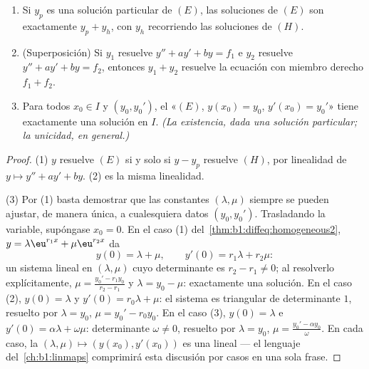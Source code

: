 \begin{theorem}\label{thm:b1:diffeq:structure2}
\begin{enumerate}
  \item Si $y_p$ es una solución particular de $(E)$, las soluciones
        de $(E)$ son exactamente $y_p + y_h$, con $y_h$ recorriendo
        las soluciones de $(H)$.
  \item (Superposición) Si $y_1$ resuelve $y'' + ay' + by = f_1$ e
        $y_2$ resuelve $y'' + ay' + by = f_2$, entonces $y_1 + y_2$
        resuelve la ecuación con miembro derecho $f_1 + f_2$.
  \item Para todos $x_0 \in I$ y $(y_0, y_0')$, el 
        «$(E)$, $y(x_0) = y_0$, $y'(x_0) = y_0'$» tiene exactamente una
        solución en $I$. \emph{(La existencia, dada una solución
        particular; la unicidad, en general.)}
\end{enumerate}
\end{theorem}

\begin{proof}
(1) $y$ resuelve $(E)$ si y solo si $y - y_p$ resuelve $(H)$, por
linealidad de $y \mapsto y'' + ay' + by$. (2) es la misma linealidad.

(3) Por (1) basta demostrar que las constantes $(\lambda, \mu)$ siempre
se pueden ajustar, de manera única, a cualesquiera datos
$(y_0, y_0')$. Trasladando la variable, supóngase $x_0 = 0$. En el caso
(1) del~\cref{thm:b1:diffeq:homogeneous2}, $y = \lambda\eu^{r_1x} +
\mu\eu^{r_2x}$ da
\[
y(0) = \lambda + \mu, \qquad y'(0) = r_1\lambda + r_2\mu :
\]
un sistema lineal en $(\lambda, \mu)$ cuyo determinante es
$r_2 - r_1 \neq 0$; al resolverlo explícitamente,
$\mu = \frac{y_0' - r_1y_0}{r_2 - r_1}$ y $\lambda = y_0 - \mu$:
exactamente una solución. En el caso (2), $y(0) = \lambda$ y
$y'(0) = r_0\lambda + \mu$: el sistema es triangular de determinante
$1$, resuelto por $\lambda = y_0$, $\mu = y_0' - r_0y_0$. En el caso
(3), $y(0) = \lambda$ e $y'(0) = \alpha\lambda + \omega\mu$:
determinante $\omega \neq 0$, resuelto por $\lambda = y_0$,
$\mu = \frac{y_0' - \alpha y_0}\omega$. En cada caso, la 
$(\lambda, \mu) \mapsto (y(x_0), y'(x_0))$ es una  lineal ---
el lenguaje del~\cref{ch:b1:linmaps} comprimirá esta discusión por
casos en una sola frase.
\end{proof}


